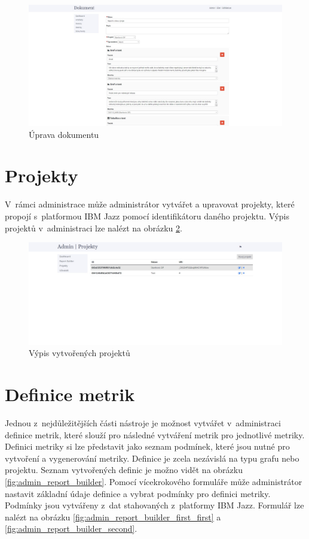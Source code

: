 \documentclass[czech,master]{diploma}
\begin{document}
\begin{figure}[!ht]
    \centering
    \includegraphics[width=1\textwidth]{Diplomka/Figures/metrics_tool/documents_edit.jpg}
    \caption{Úprava dokumentu}
    \label{fig:metrics_tool_documents_edit}
\end{figure}
\newpage
\section{Projekty}

V~rámci administrace může administrátor vytvářet a upravovat projekty, které propojí s~platformou IBM Jazz pomocí identifikátoru daného projektu. Výpis projektů v~administraci lze nalézt na obrázku \ref{fig:metrics_tool_admin_projects}.


\begin{figure}[!ht]
    \centering
    \includegraphics[width=1\textwidth]{Diplomka/Figures/metrics_tool/admin_projects.jpg}
    \caption{Výpis vytvořených projektů}
    \label{fig:metrics_tool_admin_projects}
\end{figure}
\newpage
\section{Definice metrik}
Jednou z~nejdůležitějších části nástroje je možnost vytvářet v~administraci definice metrik, které slouží pro následné vytváření metrik pro jednotlivé metriky. Definici metriky si lze představit jako seznam podmínek, které jsou nutné pro vytvoření a vygenerování metriky. Definice je zcela nezávislá na typu grafu nebo projektu. Seznam vytvořených definic je možno vidět na obrázku \ref{fig:admin_report_builder}. Pomocí vícekrokového formuláře může administrátor nastavit základní údaje definice a vybrat podmínky pro definici metriky. Podmínky jsou vytvářeny z~dat stahovaných z~platformy IBM Jazz. Formulář lze nalézt na obrázku \ref{fig:admin_report_builder_first_first} a \ref{fig:admin_report_builder_second}.
\end{document}
